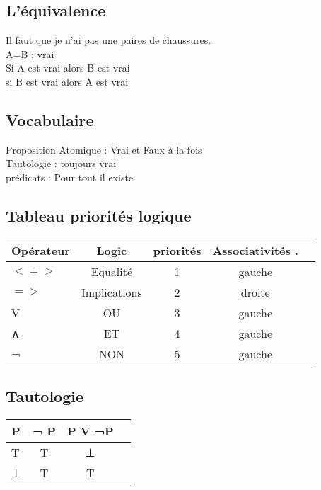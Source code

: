\subsection{L'équivalence}
\vspace{5mm} %

Il faut que je n'ai pas une paires de chaussures. \\
A=B : vrai \\
Si A est vrai alors B est vrai \\
si B est vrai alors A est vrai \\

\subsection{Vocabulaire}
\vspace{5mm} %

Proposition Atomique : Vrai et Faux à la fois \\
Tautologie : toujours vrai \\
prédicats :  Pour tout il existe \\



\subsection{Tableau priorités logique}
\begin{tabular}{|l|c|c|c|c|}
  \hline
  Opérateur & Logic & priorités & Associativités .\\
  \hline
  $<=>$ & Equalité & 1 & gauche \\
  $=>$ & Implications & 2 & droite \\
  V & OU & 3 & gauche \\
  ∧ & ET & 4 & gauche \\
  ¬ & NON & 5 & gauche \\
  \hline
\end{tabular}


\subsection{Tautologie}
\begin{tabular}{|l|c|c|c|}
  \hline
  P & ¬ P & P V ¬P \\
  \hline
  T & T & ⊥ \\
  ⊥ & T & T \\
  \hline
\end{tabular}

